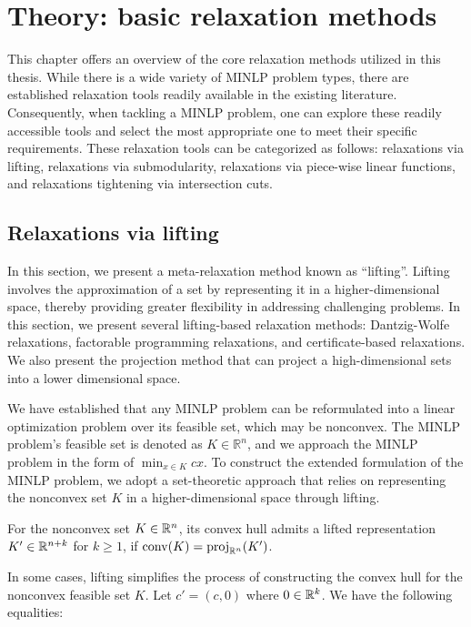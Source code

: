 
\chapter{Theory: basic relaxation methods}  %
\label{chap.basic}

This chapter offers an overview of the core relaxation methods utilized in this thesis. While there is a wide variety of MINLP problem types, there are established relaxation tools readily available in the existing literature. Consequently, when tackling a MINLP problem, one can explore these readily accessible tools and select the most appropriate one to meet their specific requirements. These relaxation tools can be categorized as follows: relaxations via lifting, relaxations via submodularity, relaxations via piece-wise linear functions, and relaxations tightening via intersection cuts.

\section{Relaxations via lifting}


In this section, we present a meta-relaxation method known as  ``lifting''. Lifting involves the approximation of a set by representing it in a higher-dimensional space, thereby providing greater flexibility in addressing challenging problems. In this section, we present several lifting-based relaxation methods: Dantzig-Wolfe relaxations, factorable programming relaxations, and certificate-based relaxations. We also present the projection method that can project a high-dimensional sets into a lower dimensional space.

We have established that any MINLP problem can be reformulated into a linear optimization problem over its feasible set, which may be nonconvex. The MINLP problem's feasible set is denoted as $K \in \mathbb{R}^n$, and we approach the MINLP problem in the form of $\min_{x \in K} cx$. To construct the extended formulation of the MINLP problem, we adopt a set-theoretic approach that relies on representing the nonconvex set $K$ in a higher-dimensional space through lifting.

\begin{definition}
    For the nonconvex set $K \in \mathbb R^n$, its convex hull admits a lifted representation $K' \in \mathbb R^{n+k}$ for $k \ge 1$, if $\operatorname{conv}(K)= \operatorname{proj}_{\mathbb R^n}(K')$.
\end{definition}

In some cases, lifting simplifies the process of constructing the convex hull for the nonconvex feasible set $K$. Let $c' = (c,0)$ where $0 \in \mathbb R^k$. We have the following equalities:

